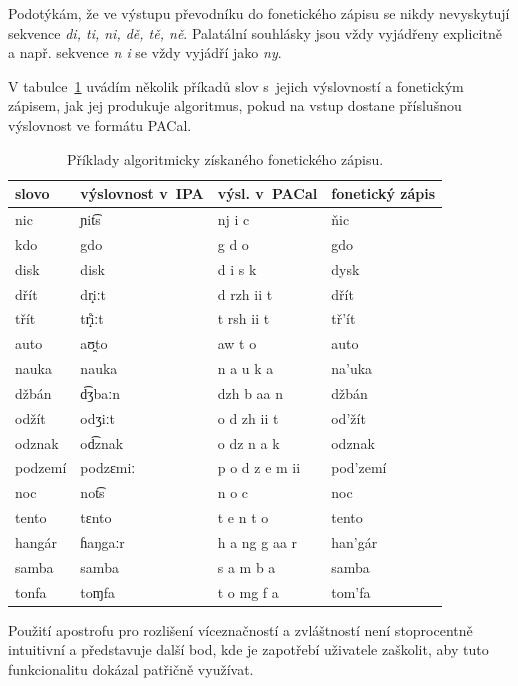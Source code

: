 Podotýkám, že ve výstupu převodníku do fonetického zápisu se nikdy nevyskytují
sekvence {\em di, ti, ni, dě, tě, ně}. Palatální souhlásky jsou vždy vyjádřeny
explicitně a např. sekvence {\em n i} se vždy vyjádří jako {\em ny}.

V tabulce~\ref{tab:priklady-fonetiky} uvádím několik příkadů slov s~jejich výslovností a fonetickým zápisem, jak jej
produkuje algoritmus, pokud na vstup dostane příslušnou výslovnost ve formátu
PACal.

\begin{table}[htpb]
\begin{center}
\begin{tabular}{|l|l|l|l|}
\hline
slovo & výslovnost v~IPA & výsl. v~PACal & fonetický zápis \\
\hline
nic & ɲit͡s  & nj i c & ňic \\
kdo & gdo & g d o & gdo \\
disk & disk & d i s k & dysk \\
dřít & dr̝iːt & d rzh ii t & dřít \\
třít & tr̝̊iːt & t rsh ii t & tř'ít \\
auto & aʊ̯to & aw t o & auto \\
nauka & nauka & n a u k a & na'uka \\
džbán & d͡ʒbaːn  & dzh b aa n & džbán \\
odžít & odʒiːt & o d zh ii t & od'žít \\
odznak & od͡znak  & o dz n a k & odznak \\
podzemí & podzɛmiː & p o d z e m ii & pod'zemí \\
noc & not͡s  & n o c & noc \\
tento & tɛnto & t e n t o & tento \\
hangár & ɦaŋgaːr & h a ng g aa r & han'gár \\
samba & samba & s a m b a & samba \\
tonfa & toɱfa & t o mg f a & tom'fa \\
\hline
\end{tabular}
\caption{Příklady algoritmicky získaného fonetického zápisu.}\label{tab:priklady-fonetiky}
\end{center}
\end{table}
\normalfont

Použití apostrofu pro rozlišení víceznačností a zvláštností není stoprocentně
intuitivní a představuje další bod, kde je zapotřebí uživatele zaškolit, aby
tuto funkcionalitu dokázal patřičně využívat.

